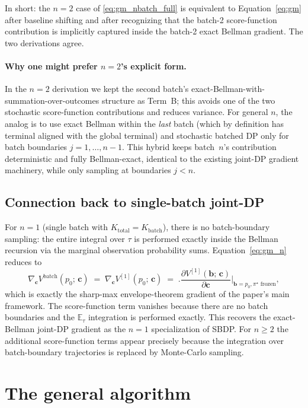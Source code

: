 \documentclass[11pt,a4paper]{article}
\newcommand{\bc}{\bm{c}}
\newcommand{\bb}{\bm{b}}
\newcommand{\E}{\mathbb{E}}
\begin{document}
In short: the $n = 2$ case of \eqref{eq:gm_nbatch_full} is equivalent to
Equation~\eqref{eq:gm} after baseline shifting and after recognizing that the batch-2
score-function contribution is implicitly captured inside the batch-2 exact Bellman gradient.
The two derivations agree.

\paragraph{Why one might prefer $n = 2$'s explicit form.}  In the $n = 2$ derivation we kept
the second batch's exact-Bellman-with-summation-over-outcomes structure as Term~B; this
avoids one of the two stochastic score-function contributions and reduces variance.  For
general $n$, the analog is to use exact Bellman within the \emph{last} batch (which by
definition has terminal aligned with the global terminal) and stochastic batched DP only
for batch boundaries $j = 1, \ldots, n-1$.  This hybrid keeps batch~$n$'s contribution
deterministic and fully Bellman-exact, identical to the existing joint-DP gradient
machinery, while only sampling at boundaries $j < n$.

\subsection{Connection back to single-batch joint-DP}
\label{sec:single_batch_check}

For $n = 1$ (single batch with $K_\mathrm{total} = K_\mathrm{batch}$), there is no
batch-boundary sampling: the entire integral over $\tau$ is performed exactly inside the
Bellman recursion via the marginal observation probability sums.
Equation~\eqref{eq:gm_n} reduces to
\[
\nabla_{\bc} V^\mathrm{batch}(p_0;\, \bc)
\;=\;
\nabla_{\bc} V^{[1]}(p_0;\, \bc)
\;=\;
\biggl.\frac{\partial V^{[1]}(\bb;\, \bc)}{\partial \bc}\biggr|_{\bb = p_0, \pi^\star \text{ frozen}},
\]
which is exactly the sharp-max envelope-theorem gradient of the paper's main framework.
The score-function term vanishes because there are no batch boundaries and the $\E_\tau$
integration is performed exactly.  This recovers the exact-Bellman joint-DP gradient as
the $n = 1$ specialization of SBDP.  For $n \ge 2$ the additional score-function terms
appear precisely because the integration over batch-boundary trajectories is replaced by
Monte-Carlo sampling.

\section{The general algorithm}
\end{document}

